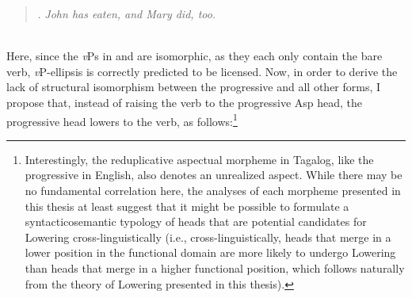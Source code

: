 \begin{minipage}{5.5in}
\begin{quote}
\ex. {\it John has eaten, and Mary did, too.}

\qtreecentertrue
\end{quote}
\end{minipage}\\
Here, since the {\it v}Ps in \Last[a] and \Last[b] are isomorphic, as they each only contain the bare verb, {\it v}P-ellipsis is correctly predicted to be licensed. Now, in order to derive the lack of structural isomorphism between the progressive and all other forms, I propose that, instead of raising the verb to the progressive Asp head, the progressive head lowers to the verb, as follows:\footnote{Interestingly, the reduplicative aspectual morpheme in Tagalog, like the progressive in English, also denotes an unrealized aspect. While there may be no fundamental correlation here, the analyses of each morpheme presented in this thesis at least suggest that it might be possible to formulate a syntacticosemantic typology of heads that are potential candidates for Lowering cross-linguistically (i.e., cross-linguistically, heads that merge in a lower position in the functional domain are more likely to undergo Lowering than heads that merge in a higher functional position, which follows naturally from the theory of Lowering presented in this thesis).}\\

